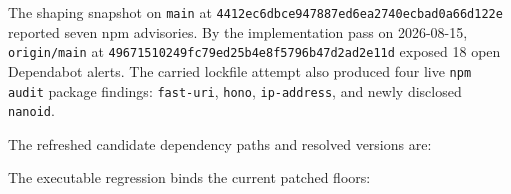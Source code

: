 The shaping snapshot on \texttt{m\allowbreak{}a\allowbreak{}i\allowbreak{}n} at \texttt{4\allowbreak{}4\allowbreak{}1\allowbreak{}2\allowbreak{}e\allowbreak{}c\allowbreak{}6\allowbreak{}d\allowbreak{}b\allowbreak{}c\allowbreak{}e\allowbreak{}9\allowbreak{}4\allowbreak{}7\allowbreak{}8\allowbreak{}8\allowbreak{}7\allowbreak{}e\allowbreak{}d\allowbreak{}6\allowbreak{}e\allowbreak{}a\allowbreak{}2\allowbreak{}7\allowbreak{}4\allowbreak{}0\allowbreak{}e\allowbreak{}c\allowbreak{}b\allowbreak{}a\allowbreak{}d\allowbreak{}0\allowbreak{}a\allowbreak{}6\allowbreak{}6\allowbreak{}d\allowbreak{}1\allowbreak{}2\allowbreak{}2\allowbreak{}e} reported seven npm advisories. By the implementation pass on 2026-08-15, \texttt{o\allowbreak{}r\allowbreak{}i\allowbreak{}g\allowbreak{}i\allowbreak{}n\allowbreak{}/\allowbreak{}m\allowbreak{}a\allowbreak{}i\allowbreak{}n} at \texttt{4\allowbreak{}9\allowbreak{}6\allowbreak{}7\allowbreak{}1\allowbreak{}5\allowbreak{}1\allowbreak{}0\allowbreak{}2\allowbreak{}4\allowbreak{}9\allowbreak{}f\allowbreak{}c\allowbreak{}7\allowbreak{}9\allowbreak{}e\allowbreak{}d\allowbreak{}2\allowbreak{}5\allowbreak{}b\allowbreak{}4\allowbreak{}e\allowbreak{}8\allowbreak{}f\allowbreak{}5\allowbreak{}7\allowbreak{}9\allowbreak{}6\allowbreak{}b\allowbreak{}4\allowbreak{}7\allowbreak{}d\allowbreak{}2\allowbreak{}a\allowbreak{}d\allowbreak{}2\allowbreak{}e\allowbreak{}1\allowbreak{}1\allowbreak{}d} exposed 18 open Dependabot alerts. The carried lockfile attempt also produced four live \texttt{n\allowbreak{}p\allowbreak{}m\allowbreak{} \allowbreak{}a\allowbreak{}u\allowbreak{}d\allowbreak{}i\allowbreak{}t} package findings: \texttt{f\allowbreak{}a\allowbreak{}s\allowbreak{}t\allowbreak{}-\allowbreak{}u\allowbreak{}r\allowbreak{}i}, \texttt{h\allowbreak{}o\allowbreak{}n\allowbreak{}o}, \texttt{i\allowbreak{}p\allowbreak{}-\allowbreak{}a\allowbreak{}d\allowbreak{}d\allowbreak{}r\allowbreak{}e\allowbreak{}s\allowbreak{}s}, and newly disclosed \texttt{n\allowbreak{}a\allowbreak{}n\allowbreak{}o\allowbreak{}i\allowbreak{}d}.

The refreshed candidate dependency paths and resolved versions are:



The executable regression binds the current patched floors:

